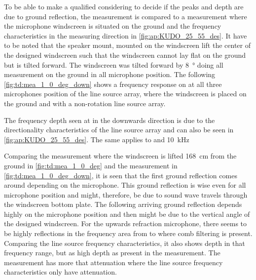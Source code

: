 

To be able to make a qualified considering to decide if the peaks and depth are due to ground reflection, the measurement is compared to a measurement where the microphone windscreen is situated on the ground and the frequency characteristics in the measuring direction in \autoref{fig:ap:KUDO_25_55_des}.  It have to be noted that the speaker mount, mounted on the windscreen lift the center of the designed windscreen such that the windscreen cannot lay flat on the ground but is tilted forward. The windscreen was tilted forward by \SI{8}{\degree} doing all measurement on the ground in all microphone position. The following \autoref{fig:td:mea_1_0_deg_down} shows a frequency response on at all three microphones position of the line source array, where the windscreen is placed on the ground and with a non-rotation line source array.


The frequency depth seen at  in the downwards direction is due to the directionality characteristics of the line source array and can also be seen in \autoref{fig:ap:KUDO_25_55_des}. The same applies to  and \SI{10}{\kilo\hertz}

Comparing the measurement where the windscreen is lifted \SI{168}{\centi\meter} from the ground in \autoref{fig:td:mea_1_0_deg} and the measurement in \autoref{fig:td:mea_1_0_deg_down}, it is seen that the first ground reflection comes around  depending on the microphone. This ground reflection is \db wise even for all microphone position and might, therefore, be due to sound wave travels through the windscreen bottom plate. The following arriving ground reflection depends highly on the microphone position and then might be due to the vertical angle of the designed windscreen. For the upwards refraction microphone, there seems to be highly reflections in the frequency area from  to  where comb filtering is present. Comparing the line source frequency characteristics, it also shows depth in that frequency range, but as high depth as present in the measurement. The measurement has more that  attenuation where the line source frequency characteristics only have  attenuation.

